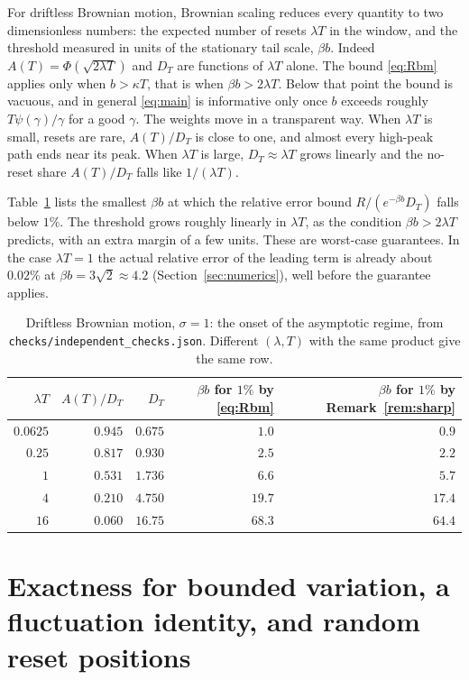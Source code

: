 \documentclass[11pt,a4paper]{article}
\begin{document}
For driftless Brownian motion, Brownian scaling reduces every quantity to two dimensionless numbers: the expected number of resets $\lambda T$ in the window, and the threshold measured in units of the stationary tail scale, $\beta b$. Indeed $A(T)=\Phi(\sqrt{2\lambda T})$ and $D_T$ are functions of $\lambda T$ alone. The bound \eqref{eq:Rbm} applies only when $b>\kappa T$, that is when $\beta b>2\lambda T$. Below that point the bound is vacuous, and in general \eqref{eq:main} is informative only once $b$ exceeds roughly $T\psi(\gamma)/\gamma$ for a good $\gamma$. The weights move in a transparent way. When $\lambda T$ is small, resets are rare, $A(T)/D_T$ is close to one, and almost every high-peak path ends near its peak. When $\lambda T$ is large, $D_T\approx\lambda T$ grows linearly and the no-reset share $A(T)/D_T$ falls like $1/(\lambda T)$.

Table~\ref{tab:onset} lists the smallest $\beta b$ at which the relative error bound $R/(e^{-\beta b}D_T)$ falls below $1\%$. The threshold grows roughly linearly in $\lambda T$, as the condition $\beta b>2\lambda T$ predicts, with an extra margin of a few units. These are worst-case guarantees. In the case $\lambda T=1$ the actual relative error of the leading term is already about $0.02\%$ at $\beta b=3\sqrt2\approx4.2$ (Section~\ref{sec:numerics}), well before the guarantee applies.

\begin{table}[h]
\centering\small
\begin{tabular}{@{}rrrrr@{}}
\toprule
$\lambda T$ & $A(T)/D_T$ & $D_T$ & $\beta b$ for $1\%$ by \eqref{eq:Rbm} & $\beta b$ for $1\%$ by Remark~\ref{rem:sharp}\\
\midrule
$0.0625$ & $0.945$ & $0.675$ & $1.0$ & $0.9$\\
$0.25$ & $0.817$ & $0.930$ & $2.5$ & $2.2$\\
$1$ & $0.531$ & $1.736$ & $6.6$ & $5.7$\\
$4$ & $0.210$ & $4.750$ & $19.7$ & $17.4$\\
$16$ & $0.060$ & $16.75$ & $68.3$ & $64.4$\\
\bottomrule
\end{tabular}
\caption{Driftless Brownian motion, $\sigma=1$: the onset of the asymptotic regime, from \texttt{checks/independent\_checks.json}. Different $(\lambda,T)$ with the same product give the same row.}
\label{tab:onset}
\end{table}

\section{Exactness for bounded variation, a fluctuation identity, and random reset positions}\label{sec:bv}
\end{document}
